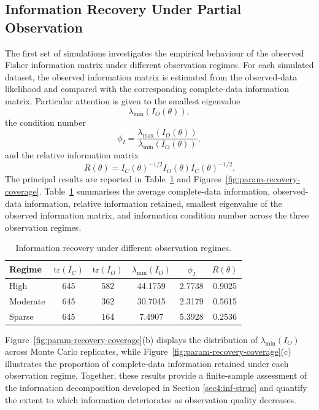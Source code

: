 \documentclass[10pt]{article}
\begin{document}
\subsection{Information Recovery Under Partial Observation}
The first set of simulations investigates the empirical behaviour of the observed Fisher information matrix under different observation regimes. For each simulated dataset, the observed information matrix is estimated from the observed-data likelihood and compared with the corresponding complete-data information matrix. Particular attention is given to the smallest eigenvalue
\[
\lambda_{\min}(I_O(\theta)),
\]
the condition number
\[
\phi_I = \frac{\lambda_{\max}(I_O(\theta))}{\lambda_{\min}(I_O(\theta))},
\]
and the relative information matrix
\[
R(\theta) = I_C(\theta)^{-1/2} I_O(\theta) I_C(\theta)^{-1/2}.
\]
The principal results are reported in Table~\ref{tab:info-recovery} and Figures~\ref{fig:param-recovery-coverage}. Table~\ref{tab:info-recovery} summarises the average complete-data information, observed-data information, relative information retained, smallest eigenvalue of the observed information matrix, and information condition number across the three observation regimes.

\begin{table}[ht]
\centering
\caption{Information recovery under different observation regimes.}
\label{tab:info-recovery}
\begin{tabular}{lccccc}
\hline
Regime & $\mathrm{tr}(I_C)$ & $\mathrm{tr}(I_O)$ & $\lambda_{\min}(I_O)$ & $\phi_I$ & $R(\theta)$ \\
\hline
High     & 645 & 582 & 44.1759 & 2.7738 &	0.9025 \\
Moderate & 645 & 362 & 30.7045	& 2.3179 & 0.5615 \\
Sparse   & 645 & 164 & 7.4907 & 5.3928 & 0.2536 \\
\hline
\end{tabular}
\end{table}

Figure~\ref{fig:param-recovery-coverage}(b) displays the distribution of $\lambda_{\min}(I_O)$ across Monte Carlo replicates, while Figure~\ref{fig:param-recovery-coverage}(c) illustrates the proportion of complete-data information retained under each observation regime. Together, these results provide a finite-sample assessment of the information decomposition developed in Section \ref{sec4:inf-struc} and quantify the extent to which information deteriorates as observation quality decreases.
\end{document}
